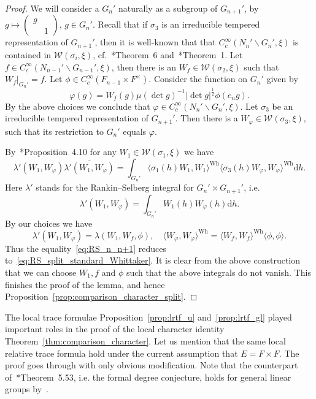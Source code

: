 \documentclass[letterpaper,11pt]{amsart}
\newcommand{\cW}{\mathcal{W}}
\newcommand{\rd}{\mathrm{d}}
\newcommand{\bs}{\backslash}
\newcommand{\<}{\negthickspace}
\providecommand{\abs}[1]{\lvert#1\rvert}
\theoremstyle{definition}
\theoremstyle{plain}
\theoremstyle{remark}
\numberwithin{equation}{section}
\begin{document}
\begin{proof}
We will consider a $G_n'$ naturally as a subgroup of $G_{n+1}'$, by $g
\mapsto
\begin{pmatrix} g \\ & 1 \end{pmatrix}$, $g \in G_n'$. Recall that if
$\sigma_3$ is an irreducible tempered representation of $G_{n+1}'$, then it
is well-known that that $C_c^\infty(N_n' \bs G_n', \xi)$ is contained in
$\cW(\sigma_i, \xi)$, cf.~\cite{GK75}*{Theorem~6}
and~\cite{Kem15}*{Theorem~1}. Let $f \in C_c^\infty(N_{n-1}'\bs
G_{n-1}', \xi)$, then there is an $W_f \in \cW(\sigma_2, \xi)$ such that
$W_f|_{G_{n}'} = f$. Let $\phi \in C_c^\infty(F_{n-1} \times F^\times)$.
Consider the function on
$G_n'$ given by
    \[
    \varphi(g) = W_f(g) \mu(\det g)^{-1} \abs{\det g}^{\frac{1}{2}}
    \phi(e_n g).
    \]
By the above choices we conclude that $\varphi \in C_c^\infty(N_n' \bs G_n',
\xi)$. Let $\sigma_3$ be an irreducible tempered representation of
$G_{n+1}'$. Then there is a $W_\varphi \in \cW(\sigma_3, \xi)$, such that its
restriction to $G_n'$ equals $\varphi$.

By~\cite{Zhang2}*{Proposition~4.10} for any $W_1 \in \cW(\sigma_1, \xi)$ we
have
    \begin{equation}    \label{eq:RS_n_n+1}
    \lambda'(W_1, W_{\varphi}) \overline{\lambda'(W_1, W_{\varphi})}
    = \int_{G_n'} \langle \sigma_1(h)W_1, W_1 \rangle^{\mathrm{Wh}}
    \langle \sigma_3(h) W_\varphi, W_{\varphi} \rangle^{\mathrm{Wh}}
    \rd h.
    \end{equation}
Here $\lambda'$ stands for the Rankin--Selberg integral for $G_n' \times
G_{n+1}'$, i.e.
    \[
    \lambda'(W_1, W_{\varphi}) = \int_{G_n'} W_1(h) W_{\varphi}(h) \rd h.
    \]
By our choices we have
    \[
    \lambda'(W_1, W_{\varphi}) = \lambda(W_1, W_f, \phi), \quad
    \langle W_\varphi, W_\varphi \rangle^{\mathrm{Wh}} =
    \langle W_f, W_f \rangle^{\mathrm{Wh}}
    \langle \phi, \phi \rangle.
    \]
Thus the equality~\eqref{eq:RS_n_n+1} reduces
to~\eqref{eq:RS_split_standard_Whittaker}. It is clear from the above
construction that we can choose $W_1, f$ and $\phi$ such that the above
integrals do not vanish. This finishes the proof of the lemma, and hence
Proposition~\ref{prop:comparison_character_split}.
\end{proof}


The local trace formulae Proposition~\ref{prop:lrtf_u} and~\ref{prop:lrtf_gl}
played important roles in the proof of the local character identity
Theorem~\ref{thm:comparison_character}. Let us mention that the same local
relative trace formula hold under the current assumption that $E = F \times
F$. The proof goes through with only obvious modification. Note that the
counterpart of~\cite{BP2}*{Theorem~5.53}, i.e. the formal degree conjecture,
holds for general linear groups by~\cite{HII}.
\end{document}
